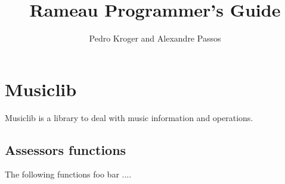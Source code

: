 \documentclass{article}
\title{Rameau Programmer's Guide}
\author{Pedro Kroger and Alexandre Passos}
\begin{document}
\maketitle

\section{Musiclib}
\label{sec:musiclib}

Musiclib is a library to deal with music information and operations.

\subsection{Assessors functions}
\label{sec:accessors-functions}

The following functions foo bar ....


\end{document}
